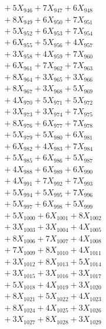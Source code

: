 \documentclass[a4paper,10pt]{article}
\begin{document}
{\begin{align}
&\;  + 5 X_{946} + 7 X_{947} + 6 X_{948} \\[0.3ex]
&\;  + 8 X_{949} + 6 X_{950} + 7 X_{951} \\[0.3ex]
&\;  + 5 X_{952} + 6 X_{953} + 7 X_{954} \\[0.3ex]
&\;  + 6 X_{955} + 5 X_{956} + 4 X_{957} \\[0.3ex]
&\;  + 3 X_{958} + 4 X_{959} + 7 X_{960} \\[0.3ex]
&\;  + 6 X_{961} + 7 X_{962} + 7 X_{963} \\[0.3ex]
&\;  + 8 X_{964} + 3 X_{965} + 3 X_{966} \\[0.3ex]
&\;  + 8 X_{967} + 3 X_{968} + 5 X_{969} \\[0.5ex]\allowbreak
&\;  + 4 X_{970} + 5 X_{971} + 5 X_{972} \\[0.3ex]
&\;  + 3 X_{973} + 3 X_{974} + 7 X_{975} \\[0.3ex]
&\;  + 8 X_{976} + 6 X_{977} + 7 X_{978} \\[0.3ex]
&\;  + 5 X_{979} + 5 X_{980} + 6 X_{981} \\[0.3ex]
&\;  + 6 X_{982} + 4 X_{983} + 7 X_{984} \\[0.3ex]
&\;  + 5 X_{985} + 6 X_{986} + 5 X_{987} \\[0.3ex]
&\;  + 4 X_{988} + 6 X_{989} + 6 X_{990} \\[0.3ex]
&\;  + 4 X_{991} + 7 X_{992} + 7 X_{993} \\[0.3ex]
&\;  + 5 X_{994} + 5 X_{995} + 7 X_{996} \\[0.3ex]
&\;  + 5 X_{997} + 6 X_{998} + 5 X_{999} \\[0.5ex]\allowbreak
&\;  + 5 X_{1000} + 6 X_{1001} + 8 X_{1002} \\[0.3ex]
&\;  + 3 X_{1003} + 3 X_{1004} + 4 X_{1005} \\[0.3ex]
&\;  + 8 X_{1006} + 7 X_{1007} + 4 X_{1008} \\[0.3ex]
&\;  + 7 X_{1009} + 8 X_{1010} + 4 X_{1011} \\[0.3ex]
&\;  + 3 X_{1012} + 8 X_{1013} + 5 X_{1014} \\[0.3ex]
&\;  + 3 X_{1015} + 3 X_{1016} + 3 X_{1017} \\[0.3ex]
&\;  + 5 X_{1018} + 4 X_{1019} + 3 X_{1020} \\[0.3ex]
&\;  + 8 X_{1021} + 5 X_{1022} + 4 X_{1023} \\[0.3ex]
&\;  + 8 X_{1024} + 4 X_{1025} + 3 X_{1026} \\[0.3ex]
&\;  + 3 X_{1027} + 8 X_{1028} + 3 X_{1029} \\[0.5ex]\allowbreak

\end{align}}
\end{document}
